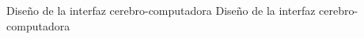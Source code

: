 \initchapterlong
    {Diseño de la interfaz cerebro-computadora}
    {Diseño de la interfaz cerebro-\\computadora}\label{chap:design bci}